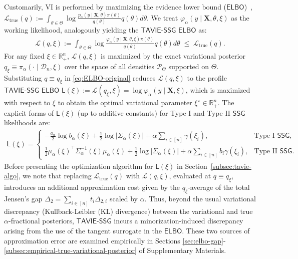 \documentclass[12pt]{article}
\numberwithin{equation}{section}
\newcommand{\ssg}{\mathsf{SSG}}
\newcommand{\tssg}{\mathsf{TAVIE}\text{-}\mathsf{SSG}}
\begin{document}
Customarily, VI is performed by maximizing the evidence lower bound ($\mathsf{ELBO}$)~\citep{Blei-VI-review-JASA}, $\mathcal{L}_{\mathrm{true}}(q) := \int_{\theta\in \Theta}\log \frac{p_{\alpha}(y\mid \mathbf X, \theta)\pi(\theta)}{q(\theta)}q(\theta)d\theta$.
We treat $\varphi_{\alpha}(y\mid \mathbf{X}, \theta, \xi)$ as the working likelihood, analogously yielding the $\tssg$ $\mathsf{ELBO}$ as:
%
\begin{align}\label{eq:ELBO-original}
    \mathcal{L}(q, \xi) := \int_{\theta \in \Theta}\log \frac{\varphi_{\alpha}(y\mid \mathbf{X}, \theta, \xi)\pi(\theta)}{q(\theta)}q(\theta)d\theta\;\leq\;\mathcal{L}_{\mathrm{true}}(q).
\end{align}
%
For any fixed $\xi \in \mathbb{R}_{+}^{n}$, 
$\mathcal{L}(q, \xi)$ is maximized by the {exact} variational posterior $q_{\xi} \equiv \pi_{\alpha}(\cdot \mid \mathcal{D}_n, \xi)$ over the space of all densities $\mathcal{P}_{\Theta}$ supported on $\Theta$.
%
Substituting $q \equiv q_{\xi}$ in \eqref{eq:ELBO-original} reduces $\mathcal{L}(q, \xi)$ to the profile $\tssg$ $\mathsf{ELBO}$ $\mathsf{L}(\xi) := \mathcal{L}(q_{\xi}, \xi) = \log\varphi_{\alpha}(y\mid \mathbf{X}, \xi)$, which is maximized with respect to $\xi$ to obtain the optimal variational parameter $\xi^{\star} \in \mathbb{R}_{+}^{n}$.
The explicit forms of $\mathsf{L}(\xi)$ (up to additive constants) for Type I and Type II $\ssg$ likelihoods are:
%
\begin{equation}\label{eq:ELBO-general}
\begin{split}
\mathsf{L}(\xi) = \begin{cases}
        -\frac{a_{\alpha}}{2}\log b_{\alpha}(\xi) + \frac{1}{2}\log |\Sigma_{\alpha}(\xi)| + \alpha\sum_{i\in[n]}\gamma(\xi_i), & \text{Type I $\ssg$},\\
        \frac{1}{2}\mu_{\alpha}(\xi)^{\top}\Sigma_{\alpha}^{-1}(\xi) \mu_{\alpha}(\xi) + \frac{1}{2}\log |\Sigma_{\alpha}(\xi)| + \alpha\sum_{i\in[n]}b_i\gamma(\xi_i), & \text{Type II $\ssg$}.
    \end{cases}
\end{split}
\end{equation}
%
Before presenting the optimization algorithm for $\mathsf{L}(\xi)$ in Section~\ref{subsec:tavie-algo}, we note that replacing $\mathcal L_{\mathrm{true}}(q)$ with $\mathcal L(q,\xi)$, evaluated at $q\equiv q_\xi$, introduces an additional approximation cost given by the $q_\xi$-average of the total Jensen’s gap $\Delta_2=\sum_{i\in[n]}t_i\Delta_{2,i}$ scaled by $\alpha$. Thus, beyond the usual variational discrepancy (Kullback-Leibler (KL) divergence) between the variational and true $\alpha$-fractional posteriors, $\tssg$ incurs a minorization-induced discrepancy arising from the use of the tangent surrogate in the $\mathsf{ELBO}$. These two sources of approximation error are examined empirically in Sections \ref{sec:elbo-gap}-\ref{subsec:empirical-true-variational-posterior} of Supplementary Materials.
\end{document}
